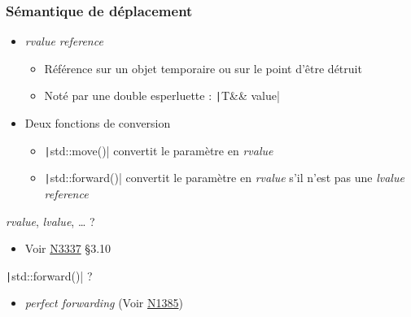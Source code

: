 \documentclass[C++.tex]{subfiles}
\begin{document}
\begin{frame}[fragile]
	\frametitle{Sémantique de déplacement}
	\begin{itemize}
		\item \textit{rvalue reference}
		\begin{itemize}
			\item Référence sur un objet temporaire ou sur le point d'être détruit
			\item Noté par une double esperluette : \texttt|T&& value|
		\end{itemize}
		\item Deux fonctions de conversion
		\begin{itemize}
			\item \texttt|std::move()| convertit le paramètre en \textit{rvalue}


			\item \texttt|std::forward()| convertit le paramètre en \textit{rvalue} s'il n'est pas une \textit{lvalue reference}
		\end{itemize}
	\end{itemize}

	\begin{block}{\textit{rvalue}, \textit{lvalue}, \ldots{} ?}
		\begin{itemize}
			\item Voir \href{http://www.open-std.org/jtc1/sc22/wg21/docs/papers/2012/n3337.pdf}{N3337\linklogo} §3.10
		\end{itemize}
	\end{block}

	\begin{block}{\texttt|std::forward()| ?}
		\begin{itemize}
			\item \textit{perfect forwarding} (Voir \href{http://www.open-std.org/jtc1/sc22/wg21/docs/papers/2002/n1385.htm}{N1385\linklogo})
		\end{itemize}
	\end{block}
\end{frame}
\end{document}
